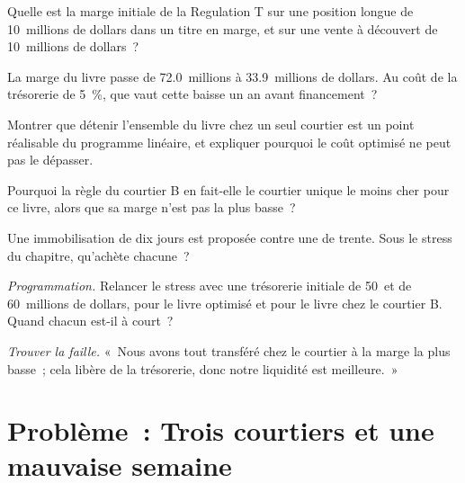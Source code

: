 \begin{exercise}[$\star$]\label{exo:fm:treasury-and-funding:2}
Quelle est la marge initiale de la Regulation T sur une position longue de 10~millions de dollars dans un titre en marge, et sur une vente à découvert de 10~millions de dollars~?
\end{exercise}

\begin{exercise}[$\star$]\label{exo:fm:treasury-and-funding:3}
La marge du livre passe de 72.0~millions à 33.9~millions de dollars. Au coût de la trésorerie de 5~\%, que vaut cette baisse un an avant financement~?
\end{exercise}

\begin{exercise}[$\star\star$]\label{exo:fm:treasury-and-funding:4}
Montrer que détenir l'ensemble du livre chez un seul courtier est un point réalisable du programme linéaire, et expliquer pourquoi le coût optimisé ne peut pas le dépasser.
\end{exercise}

\begin{exercise}[$\star\star$]\label{exo:fm:treasury-and-funding:5}
Pourquoi la règle du courtier B en fait-elle le courtier unique le moins cher pour ce livre, alors que sa marge n'est pas la plus basse~?
\end{exercise}

\begin{exercise}[$\star\star$]\label{exo:fm:treasury-and-funding:6}
Une immobilisation de dix jours est proposée contre une de trente. Sous le stress du chapitre, qu'achète chacune~?
\end{exercise}

\begin{exercise}[$\star\star\star$]\label{exo:fm:treasury-and-funding:7}
\emph{Programmation.} Relancer le stress avec une trésorerie initiale de 50~et de 60~millions de dollars, pour le livre optimisé et pour le livre chez le courtier B. Quand chacun
est-il à court~?
\end{exercise}

\begin{exercise}[$\star\star\star$]\label{exo:fm:treasury-and-funding:8}
\emph{Trouver la faille.} «~Nous avons tout transféré chez le courtier à la marge la plus basse~; cela libère de la trésorerie, donc notre liquidité est meilleure.~»
\end{exercise}

\section{Problème~: Trois courtiers et une mauvaise semaine}

